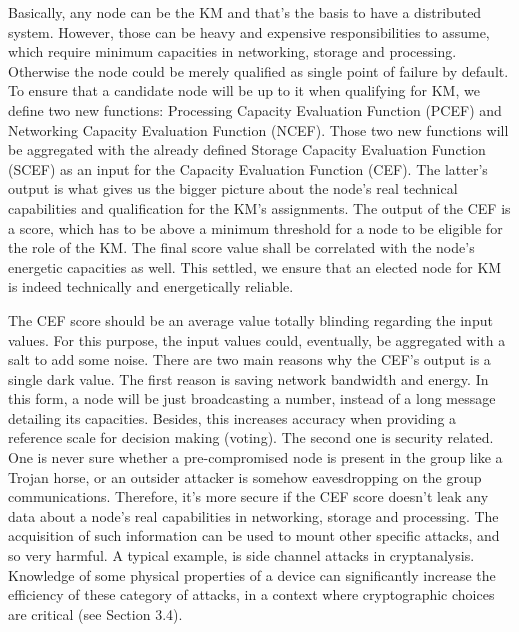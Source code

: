 Basically, any node can be the KM and that’s the basis to have a distributed system. However, those can be heavy and expensive responsibilities to assume, which require minimum capacities in networking, storage and processing. Otherwise the node could be merely qualified as single point of failure by default. To ensure that a candidate node will be up to it when qualifying for KM, we define two new functions: Processing Capacity Evaluation Function (PCEF) and Networking Capacity Evaluation Function (NCEF). Those two new functions will be aggregated with the already defined Storage Capacity Evaluation Function (SCEF) as an input for the Capacity Evaluation Function (CEF). The latter's output is what gives us the bigger picture about the node’s real technical capabilities and qualification for the KM’s assignments. The output of the CEF is a score, which has to be above a minimum threshold for a node to be eligible for the role of the KM. The final score value shall be correlated with the node’s energetic capacities as well. This settled, we ensure that an elected node for KM is indeed technically and energetically reliable.

The CEF score should be an average value totally blinding regarding the input values. For this purpose, the input values could, eventually, be aggregated with a salt to add some noise. There are two main reasons why the CEF’s output is a single dark value. The first reason is saving network bandwidth and energy. In this form, a node will be just broadcasting a number, instead of a long message detailing its capacities. Besides, this increases accuracy when providing a reference scale for decision making (voting). The second one is security related. One is never sure whether a pre-compromised node is present in the group like a Trojan horse, or an outsider attacker is somehow eavesdropping on the group communications. Therefore, it’s more secure if the CEF score doesn’t leak any data about a node’s real capabilities in networking, storage and processing. The acquisition of such information can be used to mount other specific attacks, and so very harmful. A typical example, is side channel attacks in cryptanalysis. Knowledge of some physical properties of a device can significantly increase the efficiency of these category of attacks, in a context where cryptographic choices are critical (see Section 3.4).

